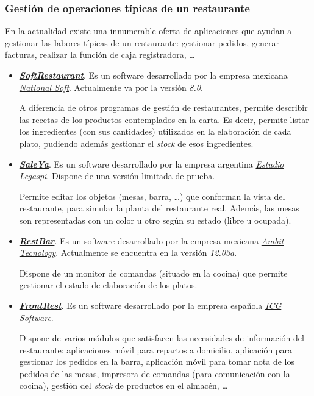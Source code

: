     \subsubsection{Gestión de operaciones típicas de un restaurante}
    En la actualidad existe una innumerable oferta de aplicaciones que ayudan
    a gestionar las labores típicas de un restaurante: gestionar pedidos,
    generar facturas, realizar la función de caja registradora, \dots
      \begin{itemize}
      \item \emph{\textbf{\href{http://www.softrestaurant.com/}
      {SoftRestaurant}}}. Es un software desarrollado por la empresa mexicana
      \emph{\href{http://www.nationalsoft.com.mx/}{National Soft}}.
      Actualmente va por la versión \emph{8.0}.


      A diferencia de otros programas de gestión de restaurantes, permite
      describir las recetas de los productos contemplados en la carta. Es 
      decir, permite listar los ingredientes (con sus cantidades) utilizados
      en la elaboración de cada plato, pudiendo además gestionar el
      \emph{stock} de esos ingredientes.

      \item \emph{\textbf{\href{http://www.estudiolegaspi.com.ar/Salewin.html}
      {SaleYa}}}. Es un software desarrollado por la empresa argentina 
      \emph{\href{http://www.estudiolegaspi.com.ar/}{Estudio Legaspi}}.
      Dispone de una versión limitada de prueba.


      Permite editar los objetos (mesas, barra, \dots) que conforman la vista 
      del restaurante, para simular la planta del restaurante real. Además, las
      mesas son representadas con un color u otro según su estado (libre u
      ocupada).

      \item \emph{\textbf{\href{http://www.restbar.com/}{RestBar}}}. Es un
      software desarrollado por la empresa mexicana
      \emph{\href{http://www.ambit.com.mx/}{Ambit Tecnology}}. Actualmente se
      encuentra en la versión \emph{12.03a}.


      Dispone de un monitor de comandas (situado en la cocina) que permite
      gestionar el estado de elaboración de los platos.

      \item \emph{\textbf{
      \href{http://www.icg.es/?es/software-programas/restaurantes-hosteleria}
      {FrontRest}}}. Es un software desarrollado por la empresa española
      \emph{\href{http://www.icg.es}{ICG Software}}.

      Dispone de varios módulos que satisfacen las necesidades de información
      del restaurante: aplicaciones móvil para repartos a domicilio, aplicación
      para gestionar los pedidos en la barra, aplicación móvil para tomar nota
      de los pedidos de las mesas, impresora de comandas (para comunicación 
      con la cocina), gestión del \emph{stock} de productos en el almacén, 
      \dots
      \end{itemize} 
